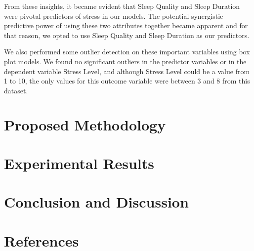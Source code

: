 \documentclass[11pt, letterpaper]{article}
\begin{document}
    From these insights, it became evident that Sleep Quality and Sleep Duration were pivotal predictors of stress in our models. The potential synergistic predictive power of using these two attributes together became apparent and for that reason, we opted to use Sleep Quality and Sleep Duration as our predictors.

    We also performed some outlier detection on these important variables using box plot models. We found no significant outliers in the predictor variables or in the dependent variable Stress Level, and although Stress Level could be a value from 1 to 10, the only values for this outcome variable were between 3 and 8 from this dataset.

    \section*{Proposed Methodology}
    

    \section*{Experimental Results}

    \section*{Conclusion and Discussion}
    
    \newpage
    \section*{References}
\end{document}
